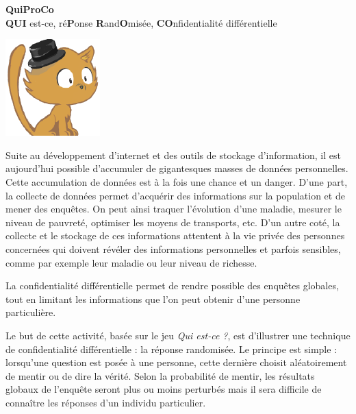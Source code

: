 \documentclass[a4paper, 12pt]{article}
\begin{document}
\begin{center}
  \Huge \textbf{QuiProCo} \\
  \vspace{5pt}
  \large \textbf{QUI} est-ce, ré\textbf{P}onse \textbf{R}and\textbf{O}misée, \textbf{CO}nfidentialité différentielle
\end{center}


  \begin{center}
   \label{fig:cat}
    \includegraphics[scale=0.9]{illustration.png}
  \end{center}


Suite au développement d'internet et des outils de stockage d'information, il est aujourd'hui possible d'accumuler de gigantesques masses de données personnelles. Cette accumulation de données est à la fois une chance et un danger.
D'une part, la collecte de données permet d’acquérir des informations sur la population et de mener des enquêtes. On peut ainsi traquer l'évolution d'une maladie, mesurer le niveau de pauvreté, optimiser les moyens de transports, etc.
D'un autre coté, la collecte et le stockage de ces informations attentent à la vie privée des personnes concernées qui doivent révéler des informations personnelles et parfois sensibles, comme par exemple leur maladie ou leur niveau de richesse.

La confidentialité différentielle permet de rendre possible des enquêtes globales, tout en limitant les informations que l'on peut obtenir d'une personne particulière.

Le but de cette activité, basée sur le jeu \emph{Qui est-ce ?}, est d'illustrer une technique de confidentialité différentielle : la réponse randomisée. Le principe est simple : lorsqu'une question est posée à une personne, cette dernière choisit aléatoirement de mentir ou de dire la vérité. Selon la probabilité de mentir, les résultats globaux de l'enquête seront plus ou moins perturbés mais il sera difficile de connaître les réponses d'un individu particulier.


\end{document}
